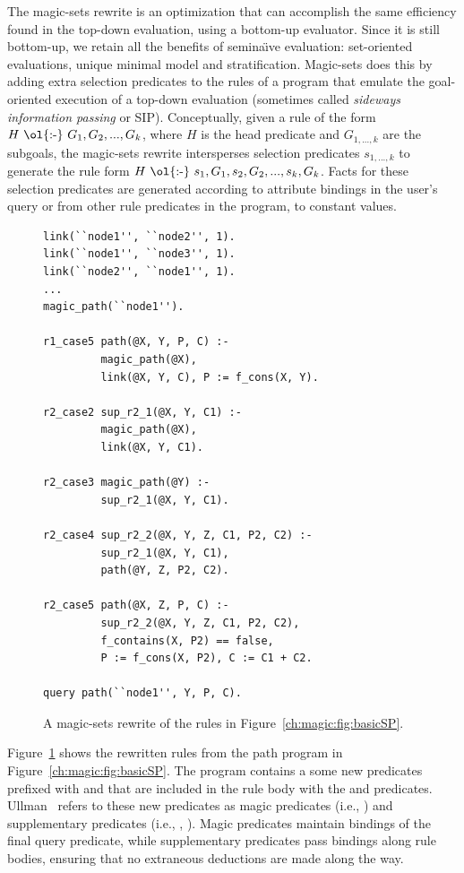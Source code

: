 The magic-sets rewrite is an optimization that can accomplish the same
efficiency found in the top-down evaluation, using a bottom-up evaluator.
Since it is still bottom-up, we retain all the benefits of semina\"{\i}ve
evaluation: set-oriented evaluations, unique minimal model and stratification.
Magic-sets does this by adding extra selection predicates to the rules of a
program that emulate the goal-oriented execution of a top-down evaluation
(sometimes called {\em sideways information passing} or SIP).  Conceptually,
given a rule of the form $H\ \text{\ol{:-}}\ G_1, G_2, ..., G_k$, where $H$ is
the head predicate and $G_{1,...,k}$ are the subgoals, the magic-sets rewrite
intersperses selection predicates $s_{1,...,k}$ to generate the rule form $H\
\text{\ol{:-}}\ s_1, G_1, s_2, G_2, ..., s_{k}, G_k$.  Facts for these
selection predicates are generated according to attribute bindings in the
user's query or from other rule predicates in the program, to constant values.

\begin{figure}[!t]
\ssp
\begin{lstlisting}
link(``node1'', ``node2'', 1).
link(``node1'', ``node3'', 1).
link(``node2'', ``node1'', 1).
...
magic_path(``node1'').

r1_case5 path(@X, Y, P, C) :-
         magic_path(@X),
         link(@X, Y, C), P := f_cons(X, Y).

r2_case2 sup_r2_1(@X, Y, C1) :-
         magic_path(@X),
         link(@X, Y, C1).

r2_case3 magic_path(@Y) :-
         sup_r2_1(@X, Y, C1).

r2_case4 sup_r2_2(@X, Y, Z, C1, P2, C2) :-
         sup_r2_1(@X, Y, C1),
         path(@Y, Z, P2, C2).

r2_case5 path(@X, Z, P, C) :-
         sup_r2_2(@X, Y, Z, C1, P2, C2),
         f_contains(X, P2) == false,
         P := f_cons(X, P2), C := C1 + C2.

query path(``node1'', Y, P, C).
\end{lstlisting}
\caption{\label{ch:magic:fig:magicSP}A magic-sets rewrite of 
the rules in Figure~\ref{ch:magic:fig:basicSP}.}
\end{figure}

Figure~\ref{ch:magic:fig:magicSP} shows the rewritten rules from the path
program in Figure~\ref{ch:magic:fig:basicSP}.  The program contains a some new
predicates prefixed with \ol{magic\_} and \ol{sup\_} that are included in the
rule body with the \ol{link} and \ol{path} predicates.
Ullman~\cite{ullmanbook} refers to these new predicates as magic predicates
(i.e., \ol{magic\_path}) and supplementary predicates (i.e., \ol{sup\_r2\_1},
\ol{sup\_r2\_2}).  Magic predicates maintain bindings of the final query
predicate, while supplementary predicates pass bindings along rule bodies,
ensuring that no extraneous deductions are made along the way.

